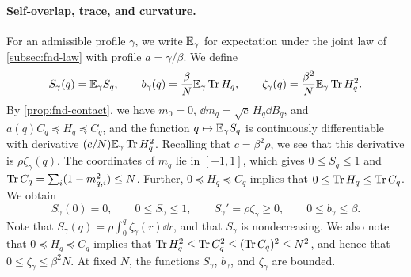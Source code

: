 \paragraph{Self-overlap, trace, and curvature.}
For an admissible profile $\gamma$, we write $\mathbb E_\gamma$ for expectation under
the joint law of \cref{subsec:fnd-law} with profile $a=\gamma/\beta$. We
define
\[
 S_\gamma(q)=\mathbb E_\gamma S_q,\qquad
 b_\gamma(q)=\frac\beta N\mathbb E_\gamma\operatorname{Tr} H_q,\qquad
 \zeta_\gamma(q)=\frac{\beta^2}N\mathbb E_\gamma\operatorname{Tr} H_q^2 .
\]
By \cref{prop:fnd-contact}, we have $m_0=0$, $\dd m_q=\sqrt c\,H_q\dd B_q$,
and $a(q)C_q\preceq H_q\preceq C_q$, and the function $q\mapsto\mathbb E_\gamma S_q$
is continuously differentiable with derivative $(c/N)\mathbb E_\gamma\operatorname{Tr} H_q^2$.
Recalling that $c=\beta^2\rho$, we see that this derivative is
$\rho\zeta_\gamma(q)$. The coordinates of $m_q$ lie in $[-1,1]$, which gives
$0\le S_q\le1$ and $\operatorname{Tr} C_q=\sum_i(1-m_{q,i}^2)\le N$. Further,
$0\preceq H_q\preceq C_q$ implies that $0\le\operatorname{Tr} H_q\le\operatorname{Tr} C_q$. We obtain
\begin{equation}\label{eq:loc-b}
 S_\gamma(0)=0,\qquad 0\le S_\gamma\le1,\qquad
 S_\gamma'=\rho\zeta_\gamma\ge0,\qquad
 0\le b_\gamma\le\beta .
\end{equation}
Note that $S_\gamma(q)=\rho\int_0^q\zeta_\gamma(r)\dd r$, and that $S_\gamma$ is
nondecreasing. We also note that $0\preceq H_q\preceq C_q$ implies that
$\operatorname{Tr} H_q^2\le\operatorname{Tr} C_q^2\le(\operatorname{Tr} C_q)^2\le N^2$, and hence that
$0\le\zeta_\gamma\le\beta^2N$. At fixed $N$, the functions $S_\gamma$,
$b_\gamma$, and $\zeta_\gamma$ are bounded.


